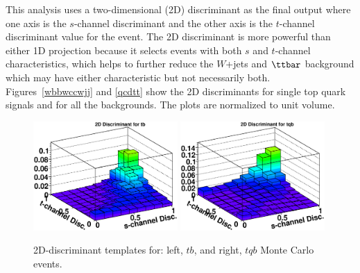 This analysis uses a two-dimensional (2D) discriminant as the final output where one axis is the $s$-channel discriminant and the other axis is the $t$-channel discriminant value for the event. The 2D discriminant is more powerful than either 1D
projection because it selects events with both $s$ and $t$-channel
characteristics, which helps to further reduce the $W$+jets and
$\ttbar$ background which may have either characteristic but not
necessarily both. Figures~\ref{wbbwccwjj} and \ref{qcdtt} show the 2D discriminants
for single top quark signals and for all the backgrounds. The
plots are normalized to unit volume.

\clearpage

\begin{figure}[!h!tbp]
\includegraphics[width=0.49\textwidth]
{eps/MatrixElement/performance/2D-Discriminant_schannel}
\includegraphics[width=0.49\textwidth]
{eps/MatrixElement/performance/2D-Discriminant_tchannel}
\vspace{-0.1in}
\caption{2D-discriminant templates for: left, $tb$, and
right, $tqb$ Monte Carlo events.}
\label{tbtqb}
\end{figure}

